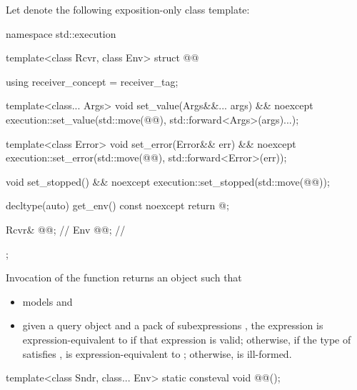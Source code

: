 \pnum
Let  denote the following exposition-only class template:
\begin{codeblock}
namespace std::execution {
  template<class Rcvr, class Env>
  struct @@ {
    using receiver_concept = receiver_tag;

    template<class... Args>
    void set_value(Args&&... args) && noexcept {
      execution::set_value(std::move(@@), std::forward<Args>(args)...);
    }

    template<class Error>
    void set_error(Error&& err) && noexcept {
      execution::set_error(std::move(@@), std::forward<Error>(err));
    }

    void set_stopped() && noexcept {
      execution::set_stopped(std::move(@@));
    }

    decltype(auto) get_env() const noexcept {
      return @\seebelow@;
    }

    Rcvr& @@;                 // \expos
    Env @@;                    // \expos
  };
}
\end{codeblock}
Invocation of the function 
returns an object  such that
\begin{itemize}
\item
{} models  and
\item
given a query object  and a pack of subexpressions ,
the expression  is expression-equivalent
to  if that expression is valid;
otherwise,
if the type of  satisfies ,
 is expression-equivalent
to ;
otherwise,
 is ill-formed.
\end{itemize}

\begin{itemdecl}
template<class Sndr, class... Env>
  static consteval void @@();
\end{itemdecl}

